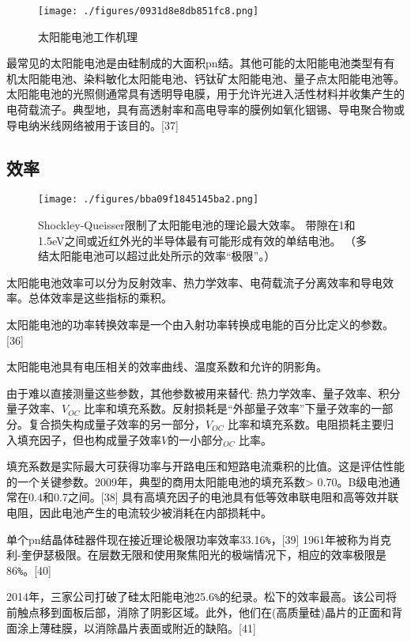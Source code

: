 \begin{figure}[ht]
\centering
\texttt{[image: ./figures/0931d8e8db851fc8.png]}
\caption{太阳能电池工作机理} \label{fig_TYNDC_11}
\end{figure}

最常见的太阳能电池是由硅制成的大面积pn结。其他可能的太阳能电池类型有有机太阳能电池、染料敏化太阳能电池、钙钛矿太阳能电池、量子点太阳能电池等。太阳能电池的光照侧通常具有透明导电膜，用于允许光进入活性材料并收集产生的电荷载流子。典型地，具有高透射率和高电导率的膜例如氧化铟锡、导电聚合物或导电纳米线网络被用于该目的。[37]

\subsection{效率}

\begin{figure}[ht]
\centering
\texttt{[image: ./figures/bba09f1845145ba2.png]}
\caption{Shockley-Queisser限制了太阳能电池的理论最大效率。 带隙在1和1.5eV之间或近红外光的半导体最有可能形成有效的单结电池。 （多结太阳能电池可以超过此处所示的效率“极限”。）} \label{fig_TYNDC_9}
\end{figure}

太阳能电池效率可以分为反射效率、热力学效率、电荷载流子分离效率和导电效率。总体效率是这些指标的乘积。

太阳能电池的功率转换效率是一个由入射功率转换成电能的百分比定义的参数。[36]

太阳能电池具有电压相关的效率曲线、温度系数和允许的阴影角。

由于难以直接测量这些参数，其他参数被用来替代: 热力学效率、量子效率、积分量子效率、$V_{OC}$ 比率和填充系数。反射损耗是“外部量子效率”下量子效率的一部分。复合损失构成量子效率的另一部分，$V_{OC}$ 比率和填充系数。电阻损耗主要归入填充因子，但也构成量子效率$V$的一小部分$_{OC}$ 比率。

填充系数是实际最大可获得功率与开路电压和短路电流乘积的比值。这是评估性能的一个关键参数。2009年，典型的商用太阳能电池的填充系数> 0.70。B级电池通常在0.4和0.7之间。[38] 具有高填充因子的电池具有低等效串联电阻和高等效并联电阻，因此电池产生的电流较少被消耗在内部损耗中。

单个pn结晶体硅器件现在接近理论极限功率效率33.16\verb`%`，[39] 1961年被称为肖克利-奎伊瑟极限。在层数无限和使用聚焦阳光的极端情况下，相应的效率极限是86\verb`%`。[40]

2014年，三家公司打破了硅太阳能电池25.6\verb`%`的纪录。松下的效率最高。该公司将前触点移到面板后部，消除了阴影区域。此外，他们在(高质量硅)晶片的正面和背面涂上薄硅膜，以消除晶片表面或附近的缺陷。[41]

